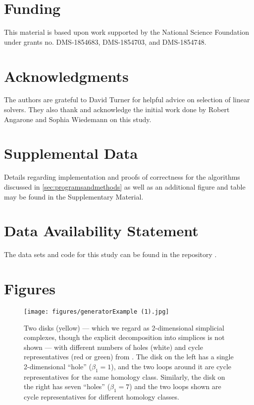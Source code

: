 \section{Funding}
This material is based upon work supported by the National Science Foundation under grants no. DMS-1854683, DMS-1854703, and DMS-1854748. 

\section{Acknowledgments} 
The authors are grateful to David Turner for helpful advice on selection of linear solvers. They also thank and acknowledge the initial work done by Robert Angarone and Sophia Wiedemann on this study.


\section{Supplemental Data}

Details regarding implementation and proofs of correctness for the algorithms discussed in \se \ref{sec:programsandmethods} as well as an additional figure and table may be found in the Supplementary Material.


\section{Data Availability Statement}
The data sets and code for this study can be found in the repository \cite{li_thompson}.

  


 
\section{Figures}
\label{figures} 

\begin{figure}[!h]
    \centering
    \DIFdelbeginFL %
\DIFdelendFL \DIFaddbeginFL \texttt{[image: figures/generatorExample (1).jpg]}
    \DIFaddendFL \caption{Two disks (yellow) --- which we regard as 2-dimensional simplicial complexes, though the explicit decomposition into simplices is not shown --- with different numbers of holes (white) and cycle representatives (red or green) from \cite{Carlsson2009TopologyAD}. The disk on the left has a single 2-dimensional  ``hole'' ($\beta_1 = 1$), and the two loops around it are cycle representatives for the same homology class. Similarly, the disk on the right has seven ``holes'' ($\beta_1 = 7$) and the two loops shown are cycle representatives for different homology classes.
    }
    \label{fig:generatorExamples}
\end{figure}


